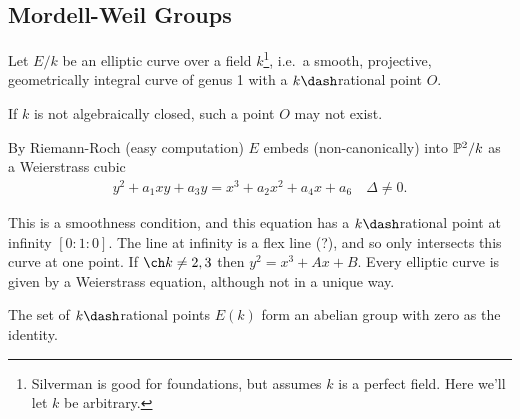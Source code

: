 \hypertarget{mordell-weil-groups}{%
\subsection{Mordell-Weil Groups}\label{mordell-weil-groups}}

Let \(E/k\) be an elliptic curve over a field \(k\)\footnote{Silverman
  is good for foundations, but assumes \(k\) is a perfect field. Here
  we'll let \(k\) be arbitrary.}, i.e.~a smooth, projective,
geometrically integral curve of genus 1 with a \(k\dash\)rational point
\(O\).

\begin{remark}

If \(k\) is not algebraically closed, such a point \(O\) may not exist.

By Riemann-Roch (easy computation) \(E\) embeds (non-canonically) into
\(\Bbb{P}^2/k\) as a Weierstrass cubic \begin{align*}
y^2 + a_1 xy + a_3 y = x^3 + a_2 x^2 + a_4 x + a_6 \quad \Delta \neq 0
.\end{align*}

This is a smoothness condition, and this equation has a
\(k\dash\)rational point at infinity \([0: 1: 0]\). The line at infinity
is a flex line (?), and so only intersects this curve at one point. If
\(\ch k \neq 2,3\) then \(y^2 = x^3 + Ax + B\). Every elliptic curve is
given by a Weierstrass equation, although not in a unique way.

\end{remark}

\begin{fact}

The set of \(k\dash\)rational points \(E(k)\) form an abelian group with
zero as the identity.

\end{fact}

